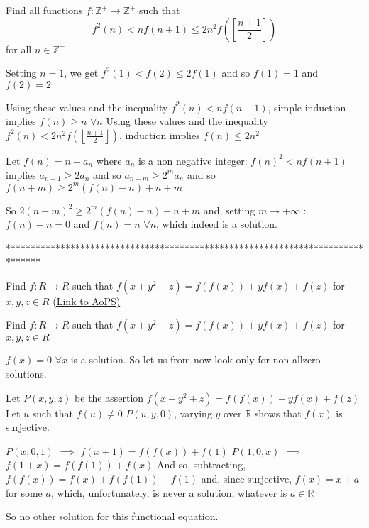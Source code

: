 \begin{solution}
	\begin{tcolorbox}Find all functions $f:{{\mathbb{Z}}^{+}}\to {{\mathbb{Z}}^{+}}$ such that
\[{{f}^{2}}(n)<nf(n+1)\le 2{{n}^{2}}f\left( \left[ \frac{n+1}{2} \right] \right)\] for all $n\in {{\mathbb{Z}}^{+}}$.\end{tcolorbox}
Setting $n=1$, we get $f^2(1)<f(2)\le 2f(1)$ and so $f(1)=1$ and $f(2)=2$

Using these values and the inequality $f^2(n)<nf(n+1)$, simple induction implies $f(n)\ge n$ $\forall n$
Using these values and the inequality $f^2(n)<2n^2f\left(\left\lfloor\frac{n+1}2\right\rfloor\right)$, induction implies $f(n)\le 2n^2$

Let $f(n)=n+a_n$ where $a_n$ is a non negative integer:
$f(n)^2<nf(n+1)$ implies $a_{n+1}\ge 2a_n$ and so $a_{n+m}\ge 2^ma_n$ and so $f(n+m)\ge 2^m(f(n)-n)+n+m$

So $2(n+m)^2\ge 2^m(f(n)-n)+n+m$ and, setting $m\to+\infty$ : $f(n)-n=0$ and $\boxed{f(n)=n}$ $\forall n$, which indeed is a solution.
\end{solution}
*******************************************************************************
-------------------------------------------------------------------------------

\begin{problem}
	Find $f:R\rightarrow R$ such that
$f(x+y^2+z)=f(f(x))+yf(x)+f(z)$ for $x,y,z \in  R$
	\flushright \href{https://artofproblemsolving.com/community/c6h581758}{(Link to AoPS)}
\end{problem}



\begin{solution}
	\begin{tcolorbox}Find $f:R\rightarrow R$ such that
$f(x+y^2+z)=f(f(x))+yf(x)+f(z)$ for $x,y,z \in  R$\end{tcolorbox}
$\boxed{f(x)=0}$ $\forall x$ is a solution. So let us from now look only for non allzero solutions.

Let $P(x,y,z)$ be the assertion $f(x+y^2+z)=f(f(x))+yf(x)+f(z)$
Let $u$ such that $f(u)\ne 0$
$P(u,y,0)$, varying $y$ over $\mathbb R$ shows that $f(x)$ is surjective.

$P(x,0,1)$ $\implies$ $f(x+1)=f(f(x))+f(1)$
$P(1,0,x)$ $\implies$ $f(1+x)=f(f(1))+f(x)$
And so, subtracting, $f(f(x))=f(x)+f(f(1))-f(1)$ and, since surjective, $f(x)=x+a$ for some $a$, which, unfortunately, is never a solution, whatever is $a\in\mathbb R$

So no other solution for this functional equation.
\end{solution}



